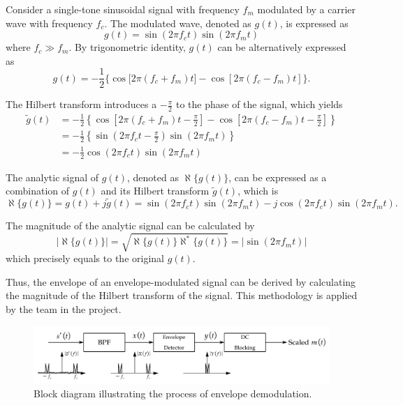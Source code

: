 \documentclass[../ECE459FinalProjectReport.tex]{subfiles}
\begin{document}
Consider a single-tone sinusoidal signal with frequency $f_m$ modulated by a carrier wave with frequency $f_c$. The modulated wave, denoted as $g(t)$, is expressed as
\begin{equation}
    g(t) = \sin(2\pi f_c t)\sin(2\pi f_m t)
\end{equation}
where $f_c\gg f_m$. By trigonometric identity, $g(t)$ can be alternatively expressed as
\begin{equation}
    g(t)=-\frac{1}{2}\{\cos\mathrm[2\pi (f_c+f_m)t]-\cos[2\pi (f_c-f_m)t]\}.
\end{equation}

The Hilbert transform introduces a $-\frac{\pi}{2}$ to the phase of the signal, which yields
\begin{equation}
    \begin{aligned}
        \tilde{g}(t)&=-\frac{1}{2}\left\lbrace\cos\left[2\pi (f_c+f_m)t - \frac{\pi}{2}\right]-\cos\left[2\pi (f_c-f_m)t - \frac{\pi}{2}\right]\right\rbrace\\
        &=-\frac{1}{2}\left\{ \sin \left( 2\pi f_ct-\frac{\pi}{2} \right) \sin \left( 2\pi f_mt \right) \right\} \\
                    &=-\frac{1}{2}\cos \left( 2\pi f_ct \right) \sin \left( 2\pi f_mt \right) 
    \end{aligned}
\end{equation}

The analytic signal of $g(t)$, denoted as $\aleph\{g(t)\}$, can be expressed as a combination of $g(t)$ and its Hilbert transform $\tilde{g}(t)$, which is
\begin{equation}
    \aleph\{g(t)\} = g(t) + j\tilde{g}(t) = \sin(2\pi f_c t)\sin(2\pi f_m t) - j\cos(2\pi f_c t)\sin(2\pi f_m t).
\end{equation}

The magnitude of the analytic signal can be calculated by
\begin{equation}
    \left| \aleph\{g(t)\}\right| = \sqrt{\aleph\{g(t)\}\aleph^*\{g(t)\}} = \left| \sin(2\pi f_m t)\right|
\end{equation}
which precisely equals to the original $g(t)$.

Thus, the envelope of an envelope-modulated signal can be derived by calculating the magnitude of the Hilbert transform of the signal. This methodology is applied by the team in the project.

\begin{figure}[htb]
    \centering
    \includegraphics[width=.9\linewidth]{plots/env-demod.pdf}
    \caption{Block diagram illustrating the process of envelope demodulation.}
    \label{fig:env-demod}
\end{figure}
\end{document}
